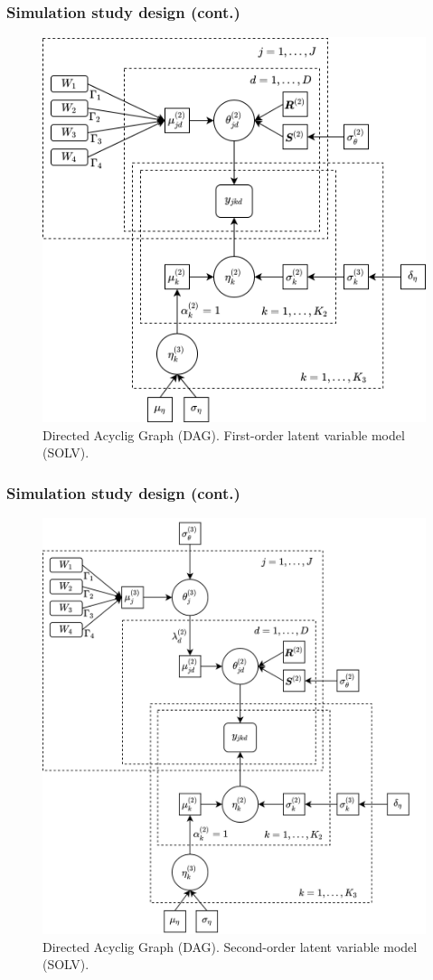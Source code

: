 \documentclass[arial,12pt,xcolor=dvipsnames]{beamer}
\begin{document}
\begin{frame}
	\frametitle{Simulation study design (cont.)}
	\begin{figure}[h]
		\centering
		\includegraphics[width=0.5\linewidth]{4_FOLV_dag}
		\caption{Directed Acyclig Graph (DAG). First-order latent variable model (SOLV).}
		\label{fig:FOLV_model}
	\end{figure}
\end{frame}
%
\begin{frame}
	\frametitle{Simulation study design (cont.)}
	\begin{figure}[h]
		\centering
		\includegraphics[width=0.50\linewidth]{4_SOLV_dag}
		\caption{Directed Acyclig Graph (DAG). Second-order latent variable model (SOLV).}
		\label{fig:SOLV_model}
	\end{figure}
\end{frame}
%
\end{document}
